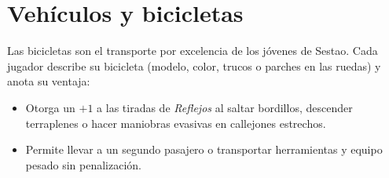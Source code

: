 \section{Vehículos y bicicletas}

Las bicicletas son el transporte por excelencia de los jóvenes de Sestao. Cada jugador describe su bicicleta (modelo, color, trucos o parches en las ruedas) y anota su ventaja:
\begin{itemize}
  \item {} Otorga un $+1$ a las tiradas de \emph{Reflejos} al saltar bordillos, descender terraplenes o hacer maniobras evasivas en callejones estrechos.
  \item {} Permite llevar a un segundo pasajero o transportar herramientas y equipo pesado sin penalización.
\end{itemize}
